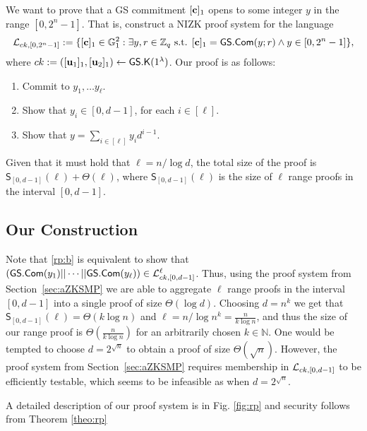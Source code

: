 We want to prove that a GS commitment $[\mathbf{c}]_1$ opens to some integer $y$ in the range $[0,2^n-1]$. That is, construct a NIZK proof system for the language
$$
\mathcal{L}_{ck,[0,2^n-1]} := \{[\mathbf{c}]_1\in\mathbb{G}_1^2: \exists y,r\in\mathbb{Z}_q\text{ s.t. }[\mathbf{c}]_1={\mathsf{GS}}.\mathsf{Com}(y;r)\wedge y\in[0,2^n-1]\},
$$
where $ck:=([\mathbf{u}_1]_1,[\mathbf{u}_2]_1)\gets{\mathsf{GS}}.\mathsf{K}(1^\lambda)$.
Our proof is as follows:
\begin{enumerate}[label=\alph*)]
\item Commit to $y_1,\ldots y_\ell$.
\item Show that $y_i\in[0,d-1]$, for each $i\in[\ell]$. \label{rp:b}
\item Show that $y=\sum_{i\in[\ell]}y_id^{i-1}$.
\end{enumerate}
Given that it must hold that $\ell=n/\log d$, the total size of the proof is $\mathsf{S}_{[0,d-1]}(\ell)+\Theta(\ell)$, where $\mathsf{S}_{[0,d-1]}(\ell)$ is the size of $\ell$ range proofs in the interval $[0,d-1]$.

\subsection{Our Construction}
Note that \ref{rp:b} is equivalent to show that $({\mathsf{GS}}.\mathsf{Com}(y_1)||\cdots||{\mathsf{GS}}.\mathsf{Com}(y_\ell))\in\mathcal{L}_{ck,[0,d-1]}^\ell$. Thus, using the proof system from Section~\ref{sec:aZKSMP} we are able to aggregate $\ell$ range proofs in the interval $[0,d-1]$ into a single proof of size $\Theta(\log d)$. Choosing $d=n^k$ we get that $\mathsf{S}_{[0,d-1]}(\ell)=\Theta(k\log n)$ and $\ell=n/\log n^k=\frac{n}{k\log n}$, and thus the size of our range proof is $\Theta(\frac{n}{k\log n})$ for an arbitrarily chosen $k\in\mathbb{N}$. One would be tempted to choose $d=2^{\sqrt{n}}$ to obtain a proof of size $\Theta(\sqrt{n})$. However, the proof system from Section~\ref{sec:aZKSMP} requires membership in $\mathcal{L}_{ck,[0,d-1]}$ to be efficiently testable, which seems to be infeasible as when $d=2^{\sqrt{n}}$.

A detailed description of our proof system is in Fig. \ref{fig:rp} and security follows from Theorem \ref{theo:rp}


